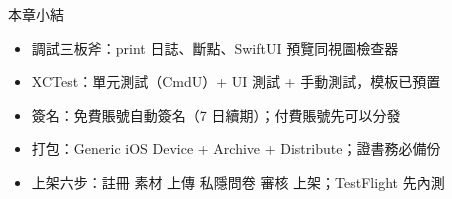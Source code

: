 \begin{tcbsummary}{本章小結}
\begin{itemize}
  \item 調試三板斧：print 日誌、斷點、SwiftUI 預覽同視圖檢查器
  \item XCTest：單元測試（CmdU）+ UI 測試 + 手動測試，模板已預置
  \item 簽名：免費賬號自動簽名（7 日續期）；付費賬號先可以分發
  \item 打包：Generic iOS Device + Archive + Distribute；證書務必備份
  \item 上架六步：註冊 素材 上傳 私隱問卷 審核 上架；TestFlight 先內測
\end{itemize}

\end{tcbsummary}
